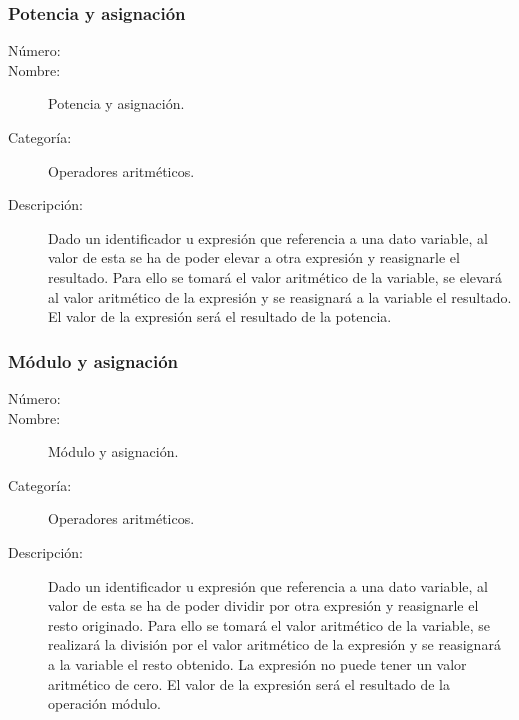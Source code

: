 \subsubsection{Potencia y asignación}
\begin{framed}
	\begin{description}
		\item [Número:] \cn
		\item [Nombre:] Potencia y asignación.
		\item [Categoría:] Operadores aritméticos.
		\item [Descripción:] Dado un identificador u expresión que referencia a una dato variable, al valor de esta se ha de poder elevar a
		otra expresión y reasignarle el resultado. Para ello se tomará el valor aritmético de la variable, se elevará al
		valor aritmético de la expresión y se reasignará a la variable el resultado. El valor de la expresión será el resultado de la potencia.
	\end {description}
\end{framed}

\subsubsection{Módulo y asignación}
\begin{framed}
	\begin{description}
		\item [Número:] \cn
		\item [Nombre:] Módulo y asignación.
		\item [Categoría:] Operadores aritméticos.
		\item [Descripción:] Dado un identificador u expresión que referencia a una dato variable, al valor de esta se ha de poder dividir por
		otra expresión y reasignarle el resto originado. Para ello se tomará el valor aritmético de la variable, se realizará la división por el
		valor aritmético de la expresión y se reasignará a la variable el resto obtenido. La expresión no puede tener un valor aritmético de cero.
		El valor de la expresión será el resultado de la operación módulo.
	\end {description}
\end{framed}
